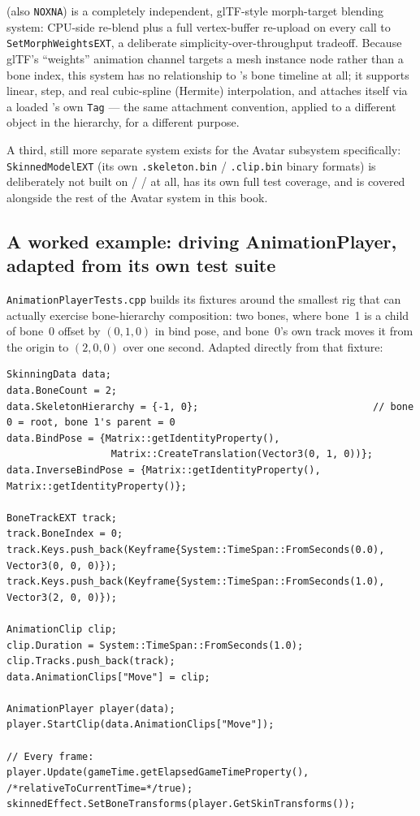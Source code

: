  (also \texttt{NOXNA}) is a completely independent, glTF-style
morph-target blending system: CPU-side re-blend plus a full vertex-buffer re-upload on every
call to \texttt{SetMorphWeightsEXT}, a deliberate simplicity-over-throughput tradeoff.
Because glTF's ``weights'' animation channel targets a mesh instance node rather than a bone
index, this system has no relationship to 's bone timeline at all;
it supports linear, step, and real cubic-spline (Hermite) interpolation, and attaches itself
via a loaded 's own \texttt{Tag} --- the same attachment convention,
applied to a different object in the hierarchy, for a different purpose.

A third, still more separate system exists for the Avatar subsystem specifically:
\texttt{SkinnedModelEXT} (its own \texttt{.skeleton.bin} / \texttt{.clip.bin} binary formats) is
deliberately not built on  /  /  at all,
has its own full test coverage, and is covered alongside the rest of the Avatar system in
this book.

\subsection{A worked example: driving AnimationPlayer, adapted from its own test suite}
\label{sec:animation-player-worked-example}

\texttt{AnimationPlayerTests.cpp} builds its fixtures around the smallest rig that can
actually exercise bone-hierarchy composition: two bones, where bone~1 is a child of bone~0
offset by $(0,1,0)$ in bind pose, and bone~0's own track moves it from the origin to
$(2,0,0)$ over one second. Adapted directly from that fixture:

\begin{lstlisting}
SkinningData data;
data.BoneCount = 2;
data.SkeletonHierarchy = {-1, 0};                              // bone 0 = root, bone 1's parent = 0
data.BindPose = {Matrix::getIdentityProperty(),
                  Matrix::CreateTranslation(Vector3(0, 1, 0))};
data.InverseBindPose = {Matrix::getIdentityProperty(), Matrix::getIdentityProperty()};

BoneTrackEXT track;
track.BoneIndex = 0;
track.Keys.push_back(Keyframe{System::TimeSpan::FromSeconds(0.0), Vector3(0, 0, 0)});
track.Keys.push_back(Keyframe{System::TimeSpan::FromSeconds(1.0), Vector3(2, 0, 0)});

AnimationClip clip;
clip.Duration = System::TimeSpan::FromSeconds(1.0);
clip.Tracks.push_back(track);
data.AnimationClips["Move"] = clip;

AnimationPlayer player(data);
player.StartClip(data.AnimationClips["Move"]);

// Every frame:
player.Update(gameTime.getElapsedGameTimeProperty(), /*relativeToCurrentTime=*/true);
skinnedEffect.SetBoneTransforms(player.GetSkinTransforms());
\end{lstlisting}

